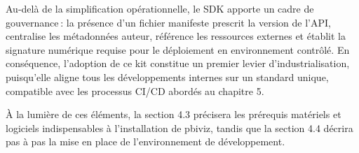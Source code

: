 Au-delà de la simplification opérationnelle, le SDK apporte un cadre de gouvernance : la présence d’un fichier manifeste prescrit la version de l’API, centralise les métadonnées auteur, référence les ressources externes et établit la signature numérique requise pour le déploiement en environnement contrôlé. En conséquence, l’adoption de ce kit constitue un premier levier d’industrialisation, puisqu’elle aligne tous les développements internes sur un standard unique, compatible avec les processus CI/CD abordés au chapitre 5.

À la lumière de ces éléments, la section 4.3 précisera les prérequis matériels et logiciels indispensables à l’installation de pbiviz, tandis que la section 4.4 décrira pas à pas la mise en place de l’environnement de développement.
